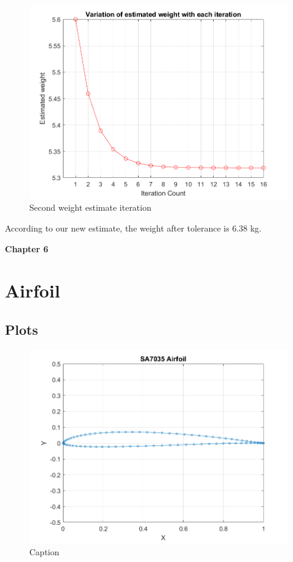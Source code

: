 \documentclass[12 pt]{article}
\begin{document}
\begin{figure}[h]
    \centering
    \includegraphics[width=1.0\linewidth]{Codes//Week 2/weight_2.png}
    \caption{Second weight estimate iteration}
    \label{Second weight estimate iteration}
\end{figure}

According to our new estimate, the weight after tolerance is 6.38 kg.

\afterpage{\clearpage}
\newpage

\textbf{\Huge{Chapter 6}}
\section{Airfoil}

\subsection{Plots}

\begin{figure}[h]
    \centering
    \includegraphics[width = \linewidth]{Codes/Week 6/Airfoil.png}
    \caption{Caption}
    \label{fig:enter-label}
\end{figure}
\end{document}
